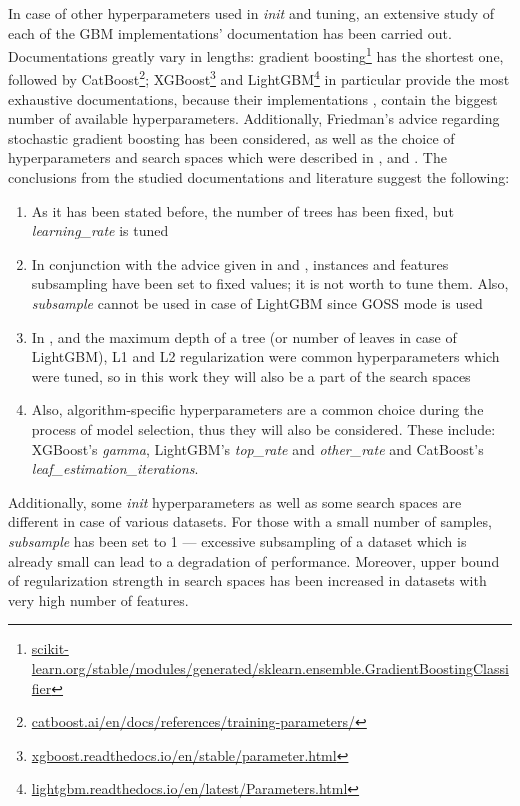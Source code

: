 \documentclass[magisterska, english]{pwr_wmat_praca_dyplomowa}
\theoremstyle{plain}
\numberwithin{theorem}{chapter}
\theoremstyle{definition}
\numberwithin{theorem}{chapter}
\begin{document}
In case of other hyperparameters used in \emph{init} and tuning, an extensive study of each of the GBM implementations' documentation has been carried out. Documentations greatly vary in lengths: gradient boosting\footnote{\url{scikit-learn.org/stable/modules/generated/sklearn.ensemble.GradientBoostingClassifier}} has the shortest one, followed by CatBoost\footnote{\url{catboost.ai/en/docs/references/training-parameters/}}; XGBoost\footnote{\url{xgboost.readthedocs.io/en/stable/parameter.html}} and LightGBM\footnote{\url{lightgbm.readthedocs.io/en/latest/Parameters.html}} in particular provide the most exhaustive documentations, because their implementations \cite{xgboost}, \cite{lightgbm} contain the biggest number of available hyperparameters. Additionally, Friedman's advice regarding stochastic gradient boosting \cite{friedman_stoch} has been considered, as well as the choice of hyperparameters and search spaces which were described in \cite{catboost}, \cite{comparative_analysis} and \cite{competitive_analysis}. The conclusions from the studied documentations and literature suggest the following:
\begin{enumerate}
    \item As it has been stated before, the number of trees has been fixed, but \emph{learning\_rate} is tuned
    \item In conjunction with the advice given in \cite{friedman_stoch} and \cite{comparative_analysis}, instances and features subsampling have been set to fixed values; it is not worth to tune them. Also, \emph{subsample} cannot be used in case of LightGBM since GOSS mode is used
    \item In \cite{catboost}, \cite{comparative_analysis} and \cite{competitive_analysis} the maximum depth of a tree (or number of leaves in case of LightGBM), L1 and L2 regularization were common hyperparameters which were tuned, so in this work they will also be a part of the search spaces
    \item Also, algorithm-specific hyperparameters are a common choice during the process of model selection, thus they will also be considered. These include: XGBoost's \emph{gamma}, LightGBM's \emph{top\_rate} and \emph{other\_rate} and CatBoost's \emph{leaf\_estimation\_iterations}. 
\end{enumerate}

Additionally, some \emph{init} hyperparameters as well as some search spaces are different in case of various datasets. For those with a small number of samples, \emph{subsample} has been set to 1 --- excessive subsampling of a dataset which is already small can lead to a degradation of performance. Moreover, upper bound of regularization strength in search spaces has been increased in datasets with very high number of features.
\end{document}
